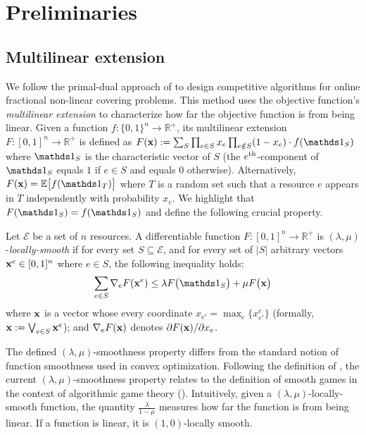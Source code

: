 \section{Preliminaries} \label{sec-prelim}

\subsection{Multilinear extension}

We follow the primal-dual approach of \cite{Thang20:Online-Primal-Dual} to design competitive algorithms for online fractional non-linear covering problems. This method uses the objective function's \emph{multilinear extension} to characterize how far the objective function is from being linear. Given a function $f: \{0,1\}^{n} \rightarrow \mathbb{R}^{+}$, its multilinear extension $F: [0,1]^{n} \rightarrow \mathbb{R}^{+}$
is defined as $F(\vect{x}) := \sum_{S} \prod_{e \in S} x_{e} \prod_{e \notin S} (1 - x_{e}) \cdot f(\one_{S})$
where $\one_{S}$ is the characteristic vector of $S$ (the $e^{\textnormal{th}}$-component of
$\one_{S}$ equals $1$ if $e \in S$ and equals 0 otherwise).
Alternatively, $F(\vect{x}) = \mathbb{E} \bigl[ f(\one_{T})\bigr]$ where $T$ is a random set
such that a resource $e$ appears in $T$ independently with probability $x_{e}$. We highlight that $F(\one_{S}) = f(\one_{S})$ and define the following crucial property.


\begin{definition}	\label{def:min-local-smooth}
Let $\mathcal{E}$ be a set of $n$ resources.
A differentiable function $F: [0,1]^{n} \rightarrow \mathbb{R}^{+}$ is $(\lambda,\mu)$-\emph{locally-smooth}
if for every set $S \subseteq \mathcal{E}$, and for every set of $|S|$ arbitrary vectors $\mathbf{x}^{e} \in [0,1]^{n}$ where $e \in S$, the following inequality holds:
\begin{equation*}	\label{eq:min-local-smooth}
\sum_{e \in S} \nabla_{e} F(\vect{x}^{e}) \leq \lambda F\bigl( \one_{S} \bigr) + \mu F\bigl( \vect{x} \bigr)
\end{equation*}
where $\mathbf{x}$ is a vector whose every coordinate $x_{e'} = \max_{e}\{x^{e}_{e'}\}$ (formally, $\mathbf{x} := \bigvee_{e \in S} \mathbf{x}^{e}$);
and $\nabla_{e} F(\mathbf{x})$ denotes $\partial F(\mathbf{x})/\partial x_{e}$.
\end{definition}

The defined $(\lambda,\mu)$-smoothness property differs from the standard notion of function smoothness used in
convex optimization. Following the definition of \cite{Thang20:Online-Primal-Dual}, the current $(\lambda,\mu)$-smoothness property relates to the definition of smooth games in the context of algorithmic game theory (\cite{Roughgarden15:Intrinsic-Robustness}). Intuitively, given a $(\lambda,\mu)$-locally-smooth function,
the quantity $\frac{\lambda}{1-\mu}$ measures how far the function is from being linear. If a function is linear, it is $(1,0)$-locally smooth.

